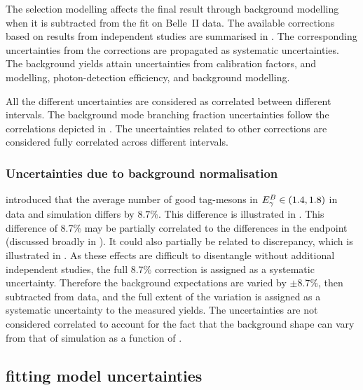 The selection modelling affects the final result through background modelling when it is subtracted from the \Mbc fit on Belle~II data.
The available corrections based on results from independent studies are summarised in .
The corresponding uncertainties from the corrections are propagated as systematic uncertainties.
The background yields attain uncertainties from \FEI calibration factors, \piVeto and \etaVeto modelling, photon-detection efficiency, and background modelling. 

All the different uncertainties are considered as correlated between different \EB intervals.
The background mode branching fraction uncertainties follow the correlations depicted in .
The uncertainties related to other corrections are considered fully correlated across different \EB intervals.

\subsubsection{Uncertainties due to background normalisation}\label{sec:background_normalisation_systematic}

 introduced that the average number of 
good tag-\B mesons in ${E^B_{\gamma}}\in(1.4,1.8)$ in data and simulation differs by $8.7\%$.
This difference is illustrated in .
This difference of 8.7\% may be partially correlated to the differences in the \Mbc endpoint (discussed broadly in ).
It could also partially be related to \ZMVA discrepancy, which is illustrated in .
As these effects are difficult to disentangle without additional independent studies, the full 8.7\% correction is assigned as a systematic uncertainty.
Therefore the background expectations are varied by $\pm 8.7\%$, then subtracted from data, and the full extent of the variation is assigned as a systematic uncertainty to the measured \BtoXsgamma yields.
The uncertainties are not considered correlated to account for the fact that the background shape can vary from that of simulation as a function of \EB.



\subsection{\texorpdfstring{\Mbc}{Mbc} fitting model uncertainties}\label{sec:fit_uncertainties}

